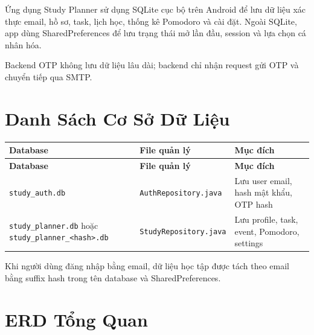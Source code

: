 \documentclass[12pt,a4paper]{report}
\begin{document}
Ứng dụng Study Planner sử dụng SQLite cục bộ trên Android để lưu dữ liệu xác thực email, hồ sơ, task, lịch học, thống kê Pomodoro và cài đặt. Ngoài SQLite, app dùng SharedPreferences để lưu trạng thái mở lần đầu, session và lựa chọn cá nhân hóa.

Backend OTP không lưu dữ liệu lâu dài; backend chỉ nhận request gửi OTP và chuyển tiếp qua SMTP.

\section{Danh Sách Cơ Sở Dữ Liệu}

\begin{longtable}{|>{\raggedright\arraybackslash}p{}|>{\raggedright\arraybackslash}p{}|>{\raggedright\arraybackslash}p{}|}
\hline
\textbf{Database} & \textbf{File quản lý} & \textbf{Mục đích} \\ \hline
\endfirsthead
\hline
\textbf{Database} & \textbf{File quản lý} & \textbf{Mục đích} \\ \hline
\endhead
\texttt{study\_auth.db} & \texttt{AuthRepository.java} & Lưu user email, hash mật khẩu, OTP hash \\ \hline
\texttt{study\_planner.db} hoặc \texttt{study\_planner\_\textless{}hash\textgreater{}.db} & \texttt{StudyRepository.java} & Lưu profile, task, event, Pomodoro, settings \\ \hline
\end{longtable}

Khi người dùng đăng nhập bằng email, dữ liệu học tập được tách theo email bằng suffix hash trong tên database và SharedPreferences.

\section{ERD Tổng Quan}
\end{document}
